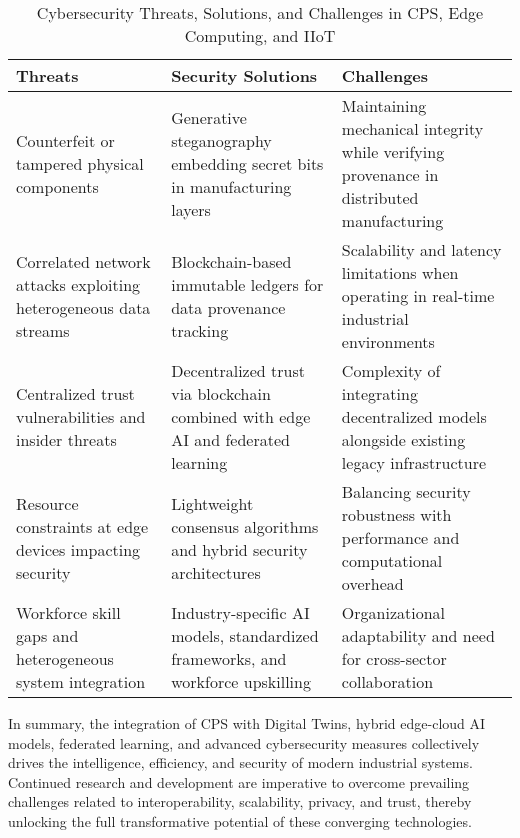 \documentclass[sigconf]{acmart}
\begin{document}
\begin{table*}[htbp]
\centering
\caption{Cybersecurity Threats, Solutions, and Challenges in CPS, Edge Computing, and IIoT}
\label{tab:cybersecurity_summary}
\begin{adjustbox}{max width=\textwidth}
\begin{tabular}{@{}lll@{}}
\toprule
\textbf{Threats} & \textbf{Security Solutions} & \textbf{Challenges} \\ \midrule
Counterfeit or tampered physical components & Generative steganography embedding secret bits in manufacturing layers~\cite{ref9,ref13} & Maintaining mechanical integrity while verifying provenance in distributed manufacturing \\
Correlated network attacks exploiting heterogeneous data streams & Blockchain-based immutable ledgers for data provenance tracking~\cite{ref20} & Scalability and latency limitations when operating in real-time industrial environments \\
Centralized trust vulnerabilities and insider threats & Decentralized trust via blockchain combined with edge AI and federated learning~\cite{ref22} & Complexity of integrating decentralized models alongside existing legacy infrastructure \\
Resource constraints at edge devices impacting security & Lightweight consensus algorithms and hybrid security architectures~\cite{ref31} & Balancing security robustness with performance and computational overhead \\
Workforce skill gaps and heterogeneous system integration & Industry-specific AI models, standardized frameworks, and workforce upskilling~\cite{ref32} & Organizational adaptability and need for cross-sector collaboration \\ \bottomrule
\end{tabular}
\end{adjustbox}
\end{table*}

\bigskip

\noindent In summary, the integration of CPS with Digital Twins, hybrid edge-cloud AI models, federated learning, and advanced cybersecurity measures collectively drives the intelligence, efficiency, and security of modern industrial systems. Continued research and development are imperative to overcome prevailing challenges related to interoperability, scalability, privacy, and trust, thereby unlocking the full transformative potential of these converging technologies.
\end{document}
